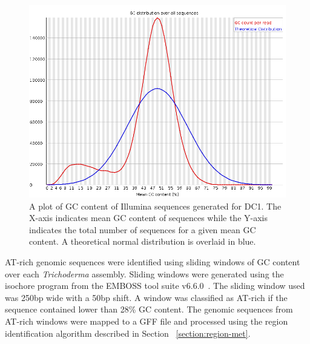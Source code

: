 \begin{figure}
  \centering
  \includegraphics[width=\textwidth]{figures/dc1-low-gc-fastqc.png}
  \caption[GC content distribution for DC1]{A plot of GC content of Illumina sequences generated for
    DC1. The X-axis indicates mean GC content of sequences while the
    Y-axis indicates the total number of sequences for a given mean GC
    content. A theoretical normal distribution is overlaid in blue.}
  \label{fig:dc1-low-gc}
\end{figure}

AT-rich genomic sequences were identified using sliding windows of GC
content over each \textit{Trichoderma} assembly. Sliding windows were
generated using the isochore program from the EMBOSS tool suite
v6.6.0~\cite{rice2000a}. The sliding window used was 250bp wide with a
50bp shift. A window was classified as AT-rich if the sequence
contained lower than 28\% GC content. The genomic sequences from
AT-rich windows were mapped to a GFF file and processed using the
region identification algorithm described in Section
~\ref{section:region-met}.



